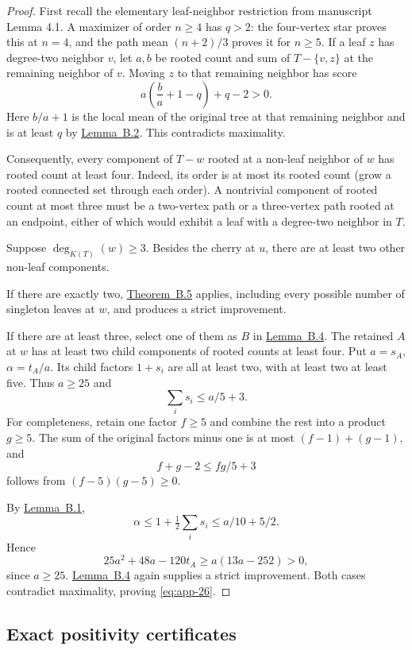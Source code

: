 \documentclass[11pt,reqno]{amsart}
\theoremstyle{plain}
\begin{document}
\begin{proof} First recall the elementary leaf-neighbor restriction from manuscript Lemma 4.1. A maximizer of order \(n\ge4\) has \(q>2\): the four-vertex star proves this at \(n=4\), and the path mean \((n+2)/3\) proves it for \(n\ge5\). If a leaf \(z\) has degree-two neighbor \(v\), let \(a,b\) be rooted count and sum of \(T-\{v,z\}\) at the remaining neighbor of \(v\). Moving \(z\) to that remaining neighbor has score \[
a\left(\frac ba+1-q\right)+q-2>0.
\] Here \(b/a+1\) is the local mean of the original tree at that remaining neighbor and is at least \(q\) by \hyperref[lem:app-2]{Lemma~B.2}. This contradicts maximality.

Consequently, every component of \(T-w\) rooted at a non-leaf neighbor of \(w\) has rooted count at least four. Indeed, its order is at most its rooted count (grow a rooted connected set through each order). A nontrivial component of rooted count at most three must be a two-vertex path or a three-vertex path rooted at an endpoint, either of which would exhibit a leaf with a degree-two neighbor in \(T\).

Suppose \(\deg_{K(T)}(w)\ge3\). Besides the cherry at \(u\), there are at least two other non-leaf components.

If there are exactly two, \hyperref[thm:app-5]{Theorem~B.5} applies, including every possible number of singleton leaves at \(w\), and produces a strict improvement.

If there are at least three, select one of them as \(B\) in \hyperref[lem:app-4]{Lemma~B.4}. The retained \(A\) at \(w\) has at least two child components of rooted counts at least four. Put \(a=s_A\), \(\alpha=t_A/a\). Its child factors \(1+s_i\) are all at least two, with at least two at least five. Thus \(a\ge25\) and \[
\sum_i s_i\le a/5+3.
\] For completeness, retain one factor \(f\ge5\) and combine the rest into a product \(g\ge5\). The sum of the original factors minus one is at most \((f-1)+(g-1)\), and \[
f+g-2\le fg/5+3
\] follows from \((f-5)(g-5)\ge0\).

By \hyperref[lem:app-1]{Lemma~B.1}, \[
\alpha\le1+\tfrac12\sum_i s_i\le a/10+5/2.
\] Hence \[
25a^2+48a-120t_A
\ge a(13a-252)>0,
\] since \(a\ge25\). \hyperref[lem:app-4]{Lemma~B.4} again supplies a strict improvement. Both cases contradict maximality, proving \eqref{eq:app-26}. \end{proof}

\subsection{Exact positivity certificates}\label{app:cherry-certificates}
\end{document}
